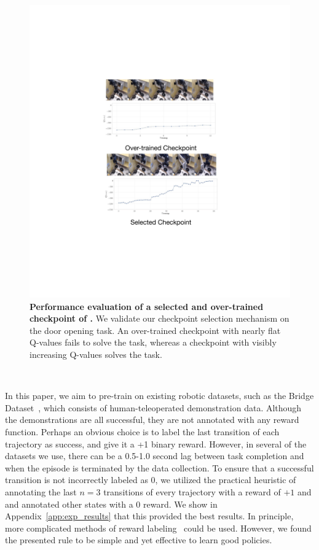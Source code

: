 \begin{figure}[h]
\centering
\vspace{-0.2cm}
  \includegraphics[width=0.6\linewidth]{chapters/ptr/fig_chkpt.pdf}
  \vspace{-0.1cm}
  \caption{\footnotesize \textbf{Performance evaluation of a selected and over-trained checkpoint of \ptrmethodname.} We validate our checkpoint selection mechanism on the door opening task. An over-trained checkpoint with nearly flat Q-values fails to solve the task, whereas a checkpoint with visibly increasing Q-values solves the task.}
  \label{fig:validation_door}
  \vspace{-0.2cm}
\end{figure}

~



In this paper, we aim to pre-train on existing robotic datasets, such as the Bridge Dataset~\citep{ebert2021bridge}, which consists of human-teleoperated demonstration data. Although the demonstrations are all successful, they are not annotated with any reward function. Perhaps an obvious choice is to label the last transition of each trajectory as success, and give it a +1 binary reward. However, in several of the datasets we use, there can be a 0.5-1.0 second lag between task completion and when the episode is terminated by the data collection. To ensure that a successful transition is not incorrectly labeled as $0$, we utilized the practical heuristic of annotating the last $n=3$ transitions of every trajectory with a reward of $+1$ and and annotated other states with a $0$ reward. We show in Appendix~\ref{app:exp_results} that this provided the best results. 
In principle, more complicated methods of reward labeling~\citep{eysenbach2021replacing} could be used. However, we found the presented rule to be simple and yet effective to learn good policies.

